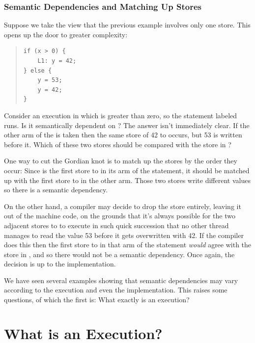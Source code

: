 \documentclass[10]{article}
\begin{document}
\subsubsection{Semantic Dependencies and Matching Up Stores}
\label{sec:Semantic Dependencies and Matching Up Stores}

Suppose we take the view that the previous example involves only one
store.
This opens up the door to greater complexity:
\begin{quote}
\begin{verbatim}
if (x > 0) {
    L1: y = 42;
} else {
    y = 53;
    y = 42;
}
\end{verbatim}
\end{quote}
Consider an execution in which  is greater than zero, so the
statement labeled  runs.
Is it semantically dependent on ?
The answer isn't immediately clear.
If the other arm of the  is taken then the same store of 42 to
 occurs, but 53 is written before it.
Which of these two stores should be compared with the store in ?

One way to cut the Gordian knot is to match up the stores by the order
they occur:
Since  is the first store to  in its arm of the 
statement, it should be matched up with the first store to  in
the other arm.
Those two stores write different values so there is a semantic
dependency.

On the other hand, a compiler may decide to drop the  store entirely, leaving it out of the machine code,
on the grounds that it's always possible for the two adjacent stores
to  to execute in such quick succession that no other thread
manages to read the value 53 before it gets overwritten with 42.
If the compiler does this then the first store to  in that
arm of the  statement \emph{would} agree with the store in
, and so there would not be a semantic dependency.
Once again, the decision is up to the implementation.

\medskip

We have seen several examples showing that semantic dependencies may vary
according to the execution and even the implementation.
This raises some questions, of which the first is:
What exactly is an execution?

\section{What is an Execution?}
\label{sec:What is an Execution?}
\end{document}
